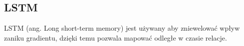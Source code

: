 \subsection{LSTM} 
LSTM (ang. Long short-term memory) jest używany aby zniewelować wpływ zaniku gradientu, dzięki 
temu pozwala mapować odległe w czasie relacje. 